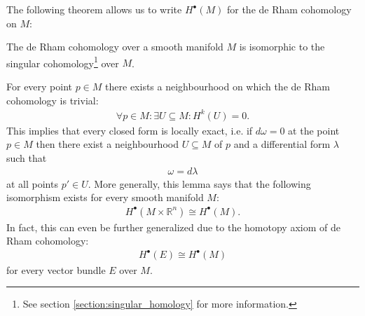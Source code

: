 

    The following theorem allows us to write $H^\bullet(M)$ for the de Rham cohomology on $M$:
    \begin{theorem}[de Rham]
        The de Rham cohomology over a smooth manifold $M$ is isomorphic to the singular cohomology\footnote{See section \ref{section:singular_homology} for more information.} over $M$.
    \end{theorem}

    \begin{theorem}\label{forms:theorem:poincare}
         For every point $p\in M$ there exists a neighbourhood on which the de Rham cohomology is trivial:
        \begin{gather}
            \forall p\in M:\exists U\subseteq M: H^k(U) = 0.
        \end{gather}
        This implies that every closed form is locally exact, i.e. if $d\omega=0$ at the point $p\in M$ then there exist a neighbourhood $U\subseteq M$ of $p$ and a differential form $\lambda$ such that
        \begin{gather}
            \omega = d\lambda
        \end{gather}
        at all points $p'\in U$. More generally, this lemma says that the following isomorphism exists for every smooth manifold $M$:
        \begin{gather}
            H^\bullet(M\times\mathbb{R}^n) \cong H^\bullet(M).
        \end{gather}
        In fact, this can even be further generalized due to the homotopy axiom of de Rham cohomology:
        \begin{gather}
            H^\bullet(E) \cong H^\bullet(M)
        \end{gather}
        for every vector bundle $E$ over $M$.
    \end{theorem}

